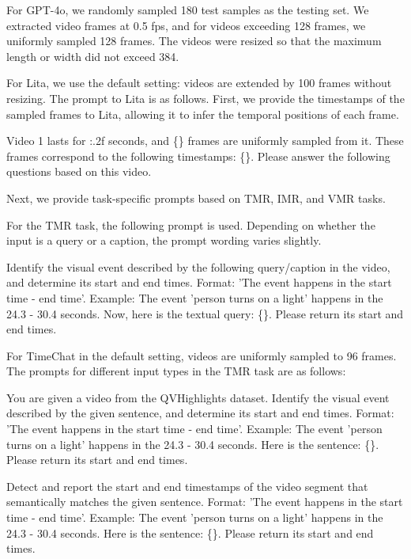\documentclass{article}
\begin{document}
For GPT-4o, we randomly sampled 180 test samples as the testing set. We extracted video frames at 0.5 fps, and for videos exceeding 128 frames, we uniformly sampled 128 frames. The videos were resized so that the maximum length or width did not exceed 384.


For Lita, we use the default setting: videos are extended by 100 frames without resizing. The prompt to Lita is as follows. First, we provide the timestamps of the sampled frames to Lita, allowing it to infer the temporal positions of each frame.

\begin{tcolorbox}[promptstyle, title={\texttt{Time Instruction}}]
Video 1 lasts for {:.2f} seconds, and \{\} frames are uniformly sampled from it.  
These frames correspond to the following timestamps: \{\}. Please answer the following questions based on this video.
\end{tcolorbox}

Next, we provide task-specific prompts based on TMR, IMR, and VMR tasks.

For the TMR task, the following prompt is used. Depending on whether the input is a query or a caption, the prompt wording varies slightly.

\begin{tcolorbox}[promptstyle, title={\texttt{TMR TASK PROMPT}}]
Identify the visual event described by the following query/caption in the video, and determine its start and end times.  
Format: 'The event happens in the start time - end time'.  
Example: The event 'person turns on a light' happens in the 24.3 - 30.4 seconds.  
Now, here is the textual query: \{\}. Please return its start and end times.
\end{tcolorbox}

For TimeChat in the default setting, videos are uniformly sampled to 96 frames. The prompts for different input types in the TMR task are as follows:

\begin{tcolorbox}[promptstyle, title={\texttt{TimeChat Query-Type TMR Task}}]
You are given a video from the QVHighlights dataset. Identify the visual event described by the given sentence, and determine its start and end times.  
Format: 'The event happens in the start time - end time'.  
Example: The event 'person turns on a light' happens in the 24.3 - 30.4 seconds.  
Here is the sentence: \{\}. Please return its start and end times.
\end{tcolorbox}

\begin{tcolorbox}[promptstyle, title={\texttt{TimeChat Caption-Type TMR Task}}]
Detect and report the start and end timestamps of the video segment that semantically matches the given sentence.  
Format: 'The event happens in the start time - end time'.  
Example: The event 'person turns on a light' happens in the 24.3 - 30.4 seconds.  
Here is the sentence: \{\}. Please return its start and end times.
\end{tcolorbox}
\end{document}
